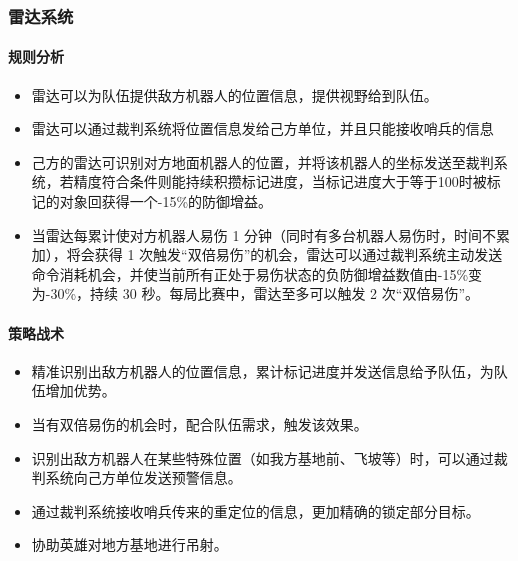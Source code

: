 

\subsubsection{雷达系统}

    \paragraph{规则分析}


    \begin{itemize}
        \item 雷达可以为队伍提供敌方机器人的位置信息，提供视野给到队伍。
        \item 雷达可以通过裁判系统将位置信息发给己方单位，并且只能接收哨兵的信息
        \item 己方的雷达可识别对方地面机器人的位置，并将该机器人的坐标发送至裁判系统，若精度符合条件则能持续积攒标记进度，当标记进度大于等于100时被标记的对象回获得一个-15\%的防御增益。
        \item 当雷达每累计使对方机器人易伤 1 分钟（同时有多台机器人易伤时，时间不累加），将会获得 1 次触发“双倍易伤”的机会，雷达可以通过裁判系统主动发送命令消耗机会，并使当前所有正处于易伤状态的负防御增益数值由-15\%变为-30\%，持续 30 秒。每局比赛中，雷达至多可以触发 2 次“双倍易伤”。
    \end{itemize}

    \paragraph{策略战术}


    \begin{itemize}
        \item 精准识别出敌方机器人的位置信息，累计标记进度并发送信息给予队伍，为队伍增加优势。
        \item 当有双倍易伤的机会时，配合队伍需求，触发该效果。
        \item 识别出敌方机器人在某些特殊位置（如我方基地前、飞坡等）时，可以通过裁判系统向己方单位发送预警信息。
        \item 通过裁判系统接收哨兵传来的重定位的信息，更加精确的锁定部分目标。
        \item 协助英雄对地方基地进行吊射。
    \end{itemize}
    

